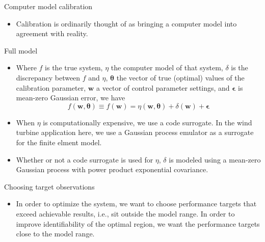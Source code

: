 \documentclass[final]{beamer}
\newlength{\onecolwid}
\begin{document}
\begin{frame}[t]
\begin{columns}[t]
\begin{column}{\onecolwid}
\begin{alertblock}{Computer model calibration}
\begin{itemize}
\item Calibration is ordinarily thought of as bringing a computer model into agreement with reality.

\end{itemize}

\end{alertblock}


\begin{alertblock}{Full model}

\begin{itemize}

\item Where $f$ is the true system, $\eta$ the computer model of that system, $\delta$ is the discrepancy between $f$ and $\eta$, $\boldsymbol \theta$ the vector of true (optimal) values of the calibration parameter, $\mathbf w$ a vector of control parameter settings, and $\boldsymbol \epsilon$ is mean-zero Gaussian error, we have
\[
f(\mathbf w,\boldsymbol \theta) \equiv f(\mathbf w) = \eta(\mathbf w,\boldsymbol \theta) + \delta(\mathbf w) + \boldsymbol \epsilon
\]

\item When $\eta$ is computationally expensive, we use a code surrogate. In the wind turbine application here, we use a Gaussian process emulator as a surrogate for the finite elment model.

\item Whether or not a code surrogate is used for $\eta$, $\delta$ is modeled using a mean-zero Gaussian process with power product exponential covariance.

\end{itemize}

\end{alertblock} 



\begin{alertblock}{Choosing target observations}

\begin{itemize}
\item In order to optimize the system, we want to choose performance targets that exceed achievable results, i.e., sit outside the model range. In order to improve identifiability of the optimal region, we want the performance targets close to the model range.


\end{itemize}
\end{alertblock}
\end{column}
\end{columns}
\end{frame}
\end{document}
